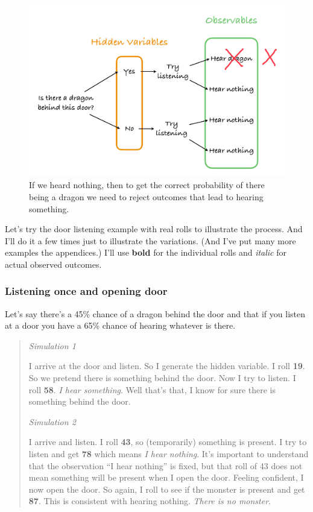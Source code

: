 \documentclass[12pt]{article}
\begin{document}
\begin{figure}
\label{tree2}
\begin{center}
\includegraphics[width=5in]{media/Tree2.pdf}
\caption{If we heard nothing, then to get the correct probability of there
being a dragon we need to reject outcomes that lead to hearing something.}
\end{center}
\end{figure}

Let's try the door listening example with real rolls to illustrate
the process. And I'll do it a few times just to illustrate the
variations. (And I've put many more examples the appendices.) I'll use
\textbf{bold} for the individual rolls and \emph{italic} for actual
observed outcomes.

\subsubsection*{Listening once and opening door}

Let's say there's a 45\% chance of a dragon behind the door
and that if you listen at a door you have a 65\% chance of hearing
whatever is there.

\begin{quote}
\emph{Simulation 1}

I arrive at the door and listen. So I generate the hidden variable. I
roll \textbf{19}. So we pretend there is something behind the door. Now
I try to listen. I roll \textbf{58}. \emph{I hear something}. Well
that's that, I know for sure there is something behind the door.

\hrulefill

\emph{Simulation 2}

I arrive and listen. I roll \textbf{43}, so (temporarily) something is
present. I try to listen and get \textbf{78} which means \emph{I hear
nothing}. It's important to understand that the observation ``I hear
nothing'' is fixed, but that roll of 43 does not mean something will be
present when I open the door. Feeling confident, I now open the door. So
again, I roll to see if the monster is present and get \textbf{87}.
This is consistent with hearing nothing.
\emph{There is no monster}.
\end{quote}
\end{document}
